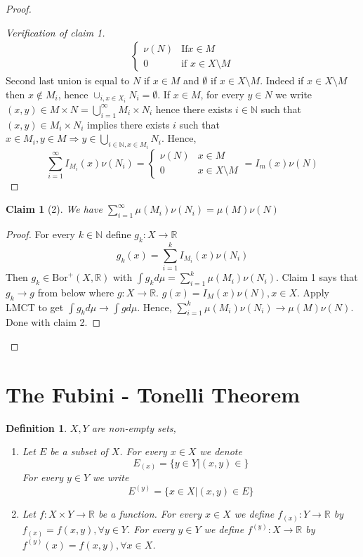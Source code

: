 \documentclass[letterpaper, 12pt]{article}
\newcommand{\bR}{\mathbb{R}}
\newcommand{\bN}{\mathbb{N}}
\newcommand{\Bor}{\mathrm{Bor}}
\theoremstyle{stdthm}
\theoremstyle{stddef}
\newtheorem{defn}[thm]{Definition}
\theoremstyle{stdnonum}
\newtheorem{claim}{Claim}
\theoremstyle{stdqands}
\theoremstyle{stdbold}
\begin{document}
\begin{proof}
\begin{proof}[Verification of claim 1]
\begin{align*}
\begin{cases}
\nu(N) & \text{If} x \in M\\
0 & \text{if } x \in X \setminus M
\end{cases}
\end{align*}
Second last union is equal to $N$ if $x \in M$ and $\emptyset$ if $x \in X \setminus M$. Indeed if $x \in X \setminus M$ then $x \notin M_i$, hence $\cup_{i, x \in X_i} N_i = \emptyset$. If $x \in M$, for every $y \in N$ we write $(x,y) \in M\times N = \bigcup_{i=1}^\infty M_i \times N_i$ hence there exists $i \in \bN$ such that $(x,y) \in M_i \times N_i$ implies there exists $i$ such that $x \in M_i, y \in M \Rightarrow y \in \bigcup_{i \in \bN, x \in M_i} N_i$. Hence, 
\[ \sum_{i=1}^\infty I_{M_i}(x) \nu(N_i) = 
\begin{cases}
\nu(N) & x \in M\\
0 & x \in X \setminus M
\end{cases}
= I_m(x) \nu(N)
\]

\end{proof}

\begin{claim} [2]
 We have $\sum_{i=1}^\infty \mu(M_i) \nu(N_i) = \mu(M) \nu(N)$
\end{claim}

\begin{proof}
For every $k \in \bN$ define $g_k: X \rightarrow \bR$ 
\[ g_k (x) = \sum_{i=1}^k I_{M_i}(x) \nu(N_i) \]
Then $g_k \in \Bor^+(X,\bR)$ with $\int g_k d\mu = \sum_{i=1}^k \mu(M_i) \nu(N_i)$. Claim 1 says that $g_k \rightarrow g$ from below where $g: X \to \bR$. $g(x) =I_M(x) \nu(N), x \in X$. Apply LMCT to get $\int g_k d\mu \rightarrow \int g d\mu$. Hence, $\sum_{i=1}^k \mu(M_i) \nu(N_i) \rightarrow \mu(M) \nu(N)$. Done with claim 2. 
\end{proof}
\end{proof}

\newpage
\section{The Fubini - Tonelli Theorem}

\begin{defn}
$X,Y$ are non-empty sets, 
\begin{enumerate}
\item Let $E$ be a subset of $X$. For every $x \in X$ we denote 
\[ E_{(x)} = \{y \in Y| (x,y) \in \} \]
For every $y \in Y$ we write 
\[ E^{(y)} = \{x \in X| (x,y) \in E \} \]
\item Let $f: X \times Y \to \bR$ be a function. For every $x \in X$ we define $f_{(x)}: Y \to \bR$ by $f_{(x)} = f(x,y), \forall y \in Y$. For every $y \in Y$ we define $f^{(y)}: X \to \bR$ by $f^{(y)}(x) = f(x,y), \forall x \in X$. 
\end{enumerate}
\end{defn}
\end{document}
